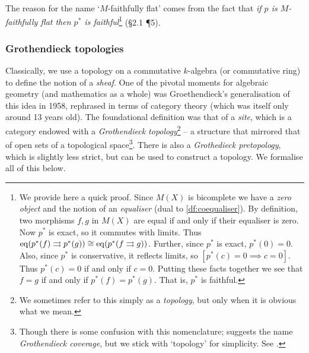         The reason for the name `$M$-faithfully flat' comes from the fact that \emph{if $p$ is $M$-faithfully flat then $p^*$ is faithful}\footnote{
            We provide here a quick proof.
            Since $M(X)$ is bicomplete we have a \emph{zero object} and the notion of an \emph{equaliser} (dual to \cref{df:coequaliser}).
            By definition, two morphisms $f,g$ in $M(X)$ are equal if and only if their equaliser is zero.
            Now $p^*$ is exact, so it commutes with limits.
            Thus $\operatorname{eq}(p^*(f)\rightrightarrows p^*(g))\cong\operatorname{eq}(p^*(f\rightrightarrows g))$.
            Further, since $p^*$ is exact, $p^*(0)=0$.
            Also, since $p^*$ is conservative, it reflects limits, so $[p^*(c)=0\implies c=0]$.
            Thus $p^*(c)=0$ if and only if $c=0$.
            Putting these facts together we see that $f=g$ if and only if $p^*(f)=p^*(g)$.
            That is, $p^*$ is faithful.
        } (\S2.1 \P5).






    \subsubsection{Grothendieck topologies} %
    \label{ssub:grothendieck_topologies}
    
        Classically, we use a topology on a commutative $k$-algebra (or commutative ring) to define the notion of a \emph{sheaf}.
        One of the pivotal moments for algebraic geometry (and mathematics as a whole) was Groethendieck's generalisation of this idea in 1958, rephrased in terms of category theory (which was itself only around 13 years old).
        The foundational definition was that of a \emph{site}, which is a category endowed with a \emph{Grothendieck topology}\footnote{
            We sometimes refer to this simply as a \emph{topology}, but only when it is obvious what we mean.
        } -- a structure that mirrored that of open sets of a topological space\footnote{
            Though there is some confusion with this nomenclature; \cite{Johnstone:2002wb} suggests the name \emph{Grothendieck coverage}, but we stick with `topology' for simplicity.
            See \cite{Skoda:2011wq}.
        }.
        There is also a \emph{Grothedieck pretopology}, which is slightly less strict, but can be used to construct a topology.
        We formalise all of this below.

